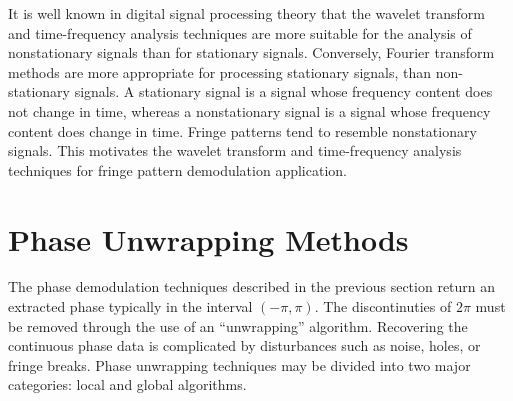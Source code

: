 \documentclass[11pt]{article} %
\begin{document}
It is well known in digital signal processing theory that the wavelet transform and time-frequency analysis techniques are more suitable for the analysis of nonstationary signals than for stationary signals. Conversely, Fourier transform methods are more appropriate for processing stationary signals, than non-stationary signals. A stationary signal is a signal whose frequency content does not change in time, whereas a nonstationary signal is a signal whose frequency content does change in time. Fringe patterns tend to resemble nonstationary signals. This motivates the wavelet transform and time-frequency analysis techniques for fringe pattern demodulation application.









\section{Phase Unwrapping Methods}

The phase demodulation techniques described in the previous section return an extracted phase typically in the interval $(-\pi, \pi)$. The discontinuties of $2 \pi$ must be removed through the use of an ``unwrapping'' algorithm. Recovering the continuous phase data is complicated by disturbances such as noise, holes, or fringe breaks. %
Phase unwrapping techniques may be divided into two major categories: local and global algorithms.
\end{document}
